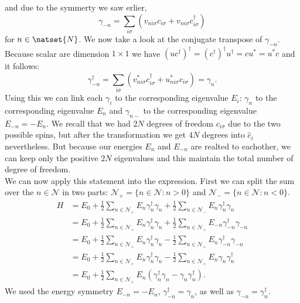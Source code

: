 \documentclass[../main.tex]{subfile}
\begin{document}
and due to the symmerty we saw erlier, 
\[
    \gamma_{-n} =  \sum_{i\sigma} \left( v_{ni\sigma}c_{i\sigma}+ v_{ni\sigma}c_{i\sigma}^{\dagger}\right)
\]
for $n\in \natset{N}$. We now take a look at the conjugate transpose of $\gamma_{-n}$. Because scalar are dimension $1\times1$ we have 
$(uc^{\dagger})^{\dagger} = (c^{\dagger})^{\dagger} u^{\dagger} =  c u^{\ast} = u^{\ast}c$ and it follows:
\[
    \gamma_{-n}^{\dagger} = \sum_{i\sigma} \left( v_{ni\sigma}^{\ast}c_{i\sigma}^{\dagger}+ u_{ni\sigma}^{\ast}c_{i\sigma}\right) = \gamma_n.
\]
Using this we can link each $\gamma_i$ to the corresponding eigenvalue $E_i$:  $\gamma_n$ to the corresponding eigenvalue $E_n$ and $\gamma_{n-}$ 
to the corresponding eigenvalue $E_{-n} = -E_n$.
We recall that we had $2N$ degrees of freedom $c_{i\sigma}$ due
to the two possible spins, but after the transformation we get $4N$ degrees into $\hat{c}_i$ nevertheless. 
But because our energies $E_n$ and $E_{-n}$ are realted to eachother, we can keep only the positive $2N$ eigenvalues
and this maintain the total number of degree of freedom.\\

We can now apply this statement into the expression. First we can split the sum over the $n\in\mathcal{N}$ in two parts: $\mathcal{N}_+ = \{n \in \mathcal{N} : n> 0 \}$ and
 $\mathcal{N}_- = \{n \in \mathcal{N} : n<0 \}$.
\begin{align*}
    H &= E_0 + \frac{1}{2}\sum_{n\in\mathcal{N}_+} E_n \gamma^{\dagger}_n\gamma_n + \frac{1}{2}\sum_{n\in\mathcal{N}_-} E_n \gamma^{\dagger}_n\gamma_n\\
      &= E_0 + \frac{1}{2}\sum_{n\in\mathcal{N}_+} E_n \gamma^{\dagger}_n\gamma_n + \frac{1}{2}\sum_{n\in\mathcal{N}_+} E_{-n} \gamma^{\dagger}_{-n}\gamma_{-n}\\
      &= E_0 + \frac{1}{2}\sum_{n\in\mathcal{N}_+} E_n \gamma^{\dagger}_n\gamma_n - \frac{1}{2}\sum_{n\in\mathcal{N}_+} E_n \gamma^{\dagger}_{-n}\gamma_{-n}\\
      &= E_0 + \frac{1}{2}\sum_{n\in\mathcal{N}_+} E_n \gamma^{\dagger}_n\gamma_n - \frac{1}{2}\sum_{n\in\mathcal{N}_+} E_n \gamma_{n}\gamma^{\dagger}_{n}\\
      &= E_0 + \frac{1}{2}\sum_{n\in\mathcal{N}_+} E_n \left( \gamma^{\dagger}_n\gamma_n -\gamma_{n}\gamma^{\dagger}_{n}\right).
\end{align*}
We used the energy symmetry $E_{-n} = -E_n$, $\gamma^{\dagger}_{-n} =\gamma_{n}$, as well as $\gamma_{-n} =\gamma^{\dagger}_{n}$.\\
\end{document}
